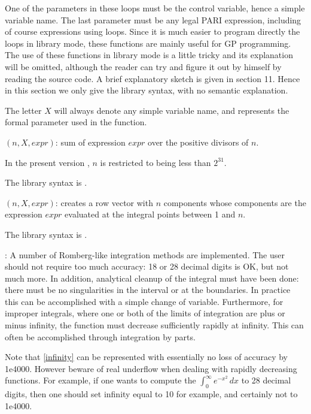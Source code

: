 One of the parameters in these loops must be the control variable, hence a
simple variable name. The last parameter must be any legal PARI expression,
including of course expressions using loops. 
Since it is much easier to program directly the loops in library mode, these
functions are mainly useful for GP programming. The use of these functions
in library mode is a little tricky and its explanation will be 
omitted, although the reader can try and figure it out by himself by reading
the source code. A brief explanatory sketch is given in section 11.
Hence in this section we only give the library syntax, with no semantic
explanation.

The letter $X$ will always denote any simple variable name, and represents the
formal parameter used in the function.

$(n,X,expr)$: sum of expression $expr$ over
the positive divisors of $n$.

In the present version \vers, $n$ is restricted to being less than $2^{31}$.

The library syntax is .

$(n,X,expr)$: creates a row vector with $n$ components
whose components are the expression $expr$ evaluated at the integral points
between 1 and $n$.

The library syntax is .

:
A number of Romberg-like integration methods are implemented. The user should
not require too much accuracy: 18 or 28 decimal digits is OK, but not much 
more. In addition, analytical cleanup of the integral must have been done: 
there must be no singularities in the interval or at the boundaries. In 
practice this can be accomplished with a simple change of variable. 
Furthermore, for improper integrals, where one or both of the limits of 
integration are plus or minus infinity, the function must decrease 
sufficiently rapidly at infinity. This can often be accomplished
through integration by parts.

Note that \ref{infinity} can be represented with essentially no loss of 
accuracy by 1e4000. However beware of real underflow when dealing with rapidly
decreasing functions. For example, if one wants to compute the
$\int_0^\infty e^{-x^2}\,dx$ to 28 decimal digits, then one should set 
infinity equal to 10 for example, and certainly not to 1e4000.

